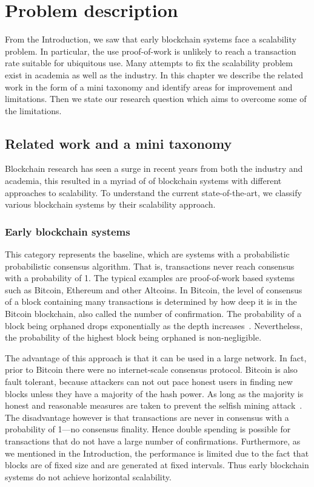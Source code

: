 \chapter{Problem description}
\label{ch:problem}

From the Introduction, we saw that early blockchain systems face a scalability problem.
In particular, the use proof-of-work is unlikely to reach a transaction rate suitable for ubiquitous use.
Many attempts to fix the scalability problem exist in academia as well as the industry.
In this chapter we describe the related work in the form of a mini taxonomy and identify areas for improvement and limitations.
Then we state our research question which aims to overcome some of the limitations.

\section{Related work and a mini taxonomy}
\label{sec:taxonomy}

Blockchain research has seen a surge in recent years from both the industry and academia,
this resulted in a myriad of of blockchain systems with different approaches to scalability.
To understand the current state-of-the-art,
we classify various blockchain systems by their scalability approach.

\subsection{Early blockchain systems}
This category represents the baseline,
which are systems with a probabilistic probabilistic consensus algorithm.
That is, transactions never reach consensus with a probability of 1.
The typical examples are proof-of-work based systems such as Bitcoin, Ethereum and other Altcoins.
In Bitcoin, the level of consensus of a block containing many transactions is determined by how deep it is in the Bitcoin blockchain,
also called the number of confirmation.
The probability of a block being orphaned drops exponentially as the depth increases~\cite{bitcoin}.
Nevertheless, the probability of the highest block being orphaned is non-negligible.

The advantage of this approach is that it can be used in a large network.
In fact, prior to Bitcoin there were no internet-scale consensus protocol.
Bitcoin is also fault tolerant,
because attackers can not out pace honest users in finding new blocks unless they have a majority of the hash power.
As long as the majority is honest and reasonable measures are taken to prevent the selfish mining attack~\cite{eyal2014majority}.
The disadvantage however is that transactions are never in consensus with a probability of 1---no consensus finality.
Hence double spending is possible for transactions that do not have a large number of confirmations.
Furthermore, as we mentioned in the Introduction,
the performance is limited due to the fact that blocks are of fixed size and are generated at fixed intervals.
Thus early blockchain systems do not achieve horizontal scalability.

